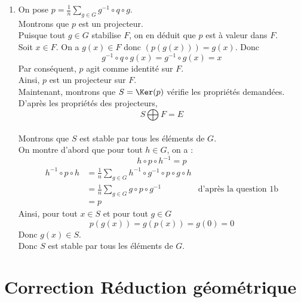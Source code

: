 \documentclass[8pt]{book}
\begin{document}
\begin{enumerate}[leftmargin=*]
		\item On pose $\displaystyle p=\frac{1}{n}\sum_{g\in G}{g^{-1}\circ q\circ g}$.\\
		Montrons que $p$ est un projecteur.\\
		Puisque tout $g\in G$ stabilise $F$, on en déduit que $p$ est à valeur dans $F$.\\
		Soit $x\in F$. On a $g(x)\in F$ donc $(p(g(x)))=g(x)$.
		Donc \[g^{-1}\circ q\circ g(x)=g^{-1}\circ g(x)=x\]	
		Par conséquent, $p$ agit comme identité sur $F$.\\
		Ainsi, $p$ est un projecteur sur $F$.\\
		Maintenant, montrons que $S=\Ker(p)$ vérifie les propriétés demandées.\\
		D'après les propriétés des projecteurs, \[S\bigoplus F=E\]\\
		Montrons que $S$ est stable par tous les éléments de $G$.\\
		On montre d'abord que pour tout $h\in G$, on a : \[h\circ p\circ h^{-1}=p\]
		\begin{align*}
			h^{-1}\circ p\circ h&=\frac{1}{n}\sum_{g\in G} h^{-1}\circ g^{-1} \circ p\circ g\circ h\\
			&=\frac{1}{n}\sum_{g\in G}g\circ p\circ g^{-1} &\text{d'après la question 1b}\\
			&=p
		\end{align*}
		Ainsi, pour tout $x\in S$ et pour tout $g\in G$ \[p(g(x))=g(p(x))=g(0)=0\]
		Donc $g(x)\in S$.\\
		Donc $S$ est stable par tous les éléments de $G$.
		\end{enumerate}
	
	\newpage
\section{Correction Réduction géométrique}
\end{document}
